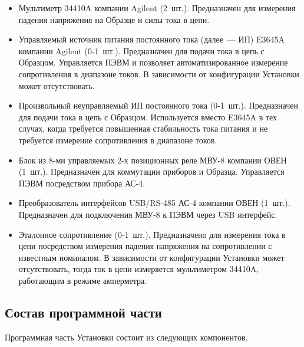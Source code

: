 \documentclass[12pt, a4paper, twocolumn]{report}
\begin{document}
\begin{itemize}

\item Мультиметр 34410A компании Agilent (2~шт.). Предназначен для измерения падения напряжения на Образце и силы тока в цепи.

\item Управляемый источник питания постоянного тока (далее~--- ИП) E3645A компании Agilent (0-1~шт.). Предназначен для подачи тока в цепь с Образцом. Управляется ПЭВМ и позволяет автоматизированное измерение сопротивления в диапазоне токов. В зависимости от конфигурации Установки может отсутствовать.

\item Произвольный неуправляемый ИП постоянного тока (0-1~шт.). Предназначен для подачи тока в цепь с Образцом. Используется вместо E3645A в тех случах, когда требуется повышенная стабильность тока питания и не требуется измерение сопротивления в диапазоне токов.

\item Блок из 8-ми управляемых 2-х позиционных реле МВУ-8 компании ОВЕН (1~шт.). Предназначен для коммутации приборов и Образца. Управляется ПЭВМ посредством прибора АС-4.

\item Преобразователь интерфейсов USB/RS-485 АС-4 компании ОВЕН (1~шт.). Предназначен для подключения МВУ-8 к ПЭВМ через USB интерфейс.

\item Эталонное сопротивление (0-1~шт.). Предназначено для измерения тока в цепи посредством измерения падения напряжения на сопротивлении с известным номиналом. В зависимости от конфигурации Установки может отсутствовать, тогда ток в цепи измеряется мультиметром 34410A, работающим в режиме амперметра.

\end{itemize}

\subsection{Состав программной части}
\label{sec_software}

Программная часть Установки состоит из следующих компонентов.
\end{document}
